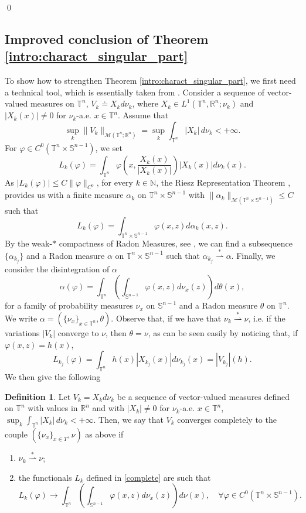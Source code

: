 \documentclass[10pt,reqno]{amsart}
\numberwithin{equation}{section}
\newcommand{\weak}{\overset{*}{\rightharpoonup}}
\newcommand{\R}{\mathbb{R}}
\newcommand{\T}{\mathbb{T}}
\newcommand{\N}{\mathbb{N}}
\theoremstyle{plain}
\theoremstyle{definition}
\newtheorem{Def}[Teo]{Definition}
\theoremstyle{remark}
\begin{document}
\qed

\subsection{Improved conclusion of Theorem \ref{intro:charact_singular_part}}\label{addit}
To show how to strengthen Theorem \ref{intro:charact_singular_part}, we first need a technical tool, which is essentially taken from \cite[Prop. 4.1]{AB}. Consider a sequence of vector-valued measures on $\T^n$, $V_k \doteq X_kd\nu_k$, where $X_k \in L^1(\T^n,\R^n; \nu_k)$ and $|X_k(x)| \neq 0$ for $\nu_k$-a.e. $x \in \T^n$. Assume that 
\[
\sup_k\|V_k\|_{\mathcal{M}(\T^n;\R^n)}= \sup_k\int_{\T^n}|X_k|\,d\nu_k < + \infty.
\]
For $\varphi \in C^0(\T^n\times\mathbb{S}^{n-1})$, we set
\begin{equation}\label{complete}
L_k(\varphi) = \int_{\T^n}\varphi\left(x,\frac{X_k(x)}{|X_k(x)|}\right)|X_k(x)|d\nu_k(x).
\end{equation}
As $|L_k(\varphi)| \le C\|\varphi\|_{C^0}$, for every $ k \in \N$, the Riesz Representation Theorem \cite[Thm. 1.38]{EVG}, provides us with a finite measure $\alpha_k$ on $\T^n\times \mathbb{S}^{n-1}$ with $\|\alpha_k\|_{\mathcal{M}(\T^n\times \mathbb{S}^{n-1})} \le C$ such that 
\[
L_k(\varphi) = \int_{\T^n\times \mathbb{S}^{n-1}}\varphi(x,z)d\alpha_k(x,z).
\]
By the weak-$*$ compactness of Radon Measures, see \cite[Thm. 1.41]{EVG}, we can find a subsequence $\{\alpha_{k_j}\}$ and a Radon measure $\alpha$ on $\T^n \times \mathbb{S}^{n-1}$ such that
$\alpha_{k_j}\weak \alpha$.
Finally, we consider the disintegration of $\alpha$ 
\[
\alpha(\varphi) = \int_{\T^n}\left(\int_{\mathbb{S}^{n-1}}\varphi(x,z)d\nu_x(z)\right)d\theta(x),
\]
for a family of probability measures $\nu_x$ on $\mathbb{S}^{n-1}$ and a Radon measure $\theta$ on $\mathbb T^n$. We write $\alpha = (\{\nu_x\}_{x \in \T^n},\theta)$. Observe that, if we have that $\nu_k \weak \nu$, i.e. if the variations $|V_k|$ converge to $\nu$, then $\theta = \nu$, as can be seen easily by noticing that, if $\varphi(x,z) = h(x)$,
\[
L_{k_j}(\varphi) = \int_{\T^n} h(x)|X_{k_j}(x)|d\nu_{k_j}(x) = |V_{k_j}|(h).
\]
We then give the following
\begin{Def}\label{cc}
Let $V_k = X_kd\nu_k$ be a sequence of vector-valued measures defined on $\T^n$ with values in $\R^n$ and with $|X_k| \neq 0$ for $\nu_k$-a.e. $x \in \T^n$, $\sup_k \int_{\T^n} |X_k|\,d\nu_k < + \infty$. Then, we say that $V_k$ converges completely to the couple $(\{\nu_x\}_{x \in T},\nu)$ as above if
\begin{enumerate}
\item $\nu_k \weak \nu$;
\item the functionals $L_k$ defined in \eqref{complete} are such that 
\[
L_k(\varphi) \to \int_{\T^n}\left(\int_{\mathbb{S}^{n-1}}\varphi(x,z)d\nu_x(z)\right)d\nu(x),\quad \forall \varphi \in C^0(\T^n\times \mathbb S^{n-1}).
\]
\end{enumerate}
\end{Def}
\end{document}
